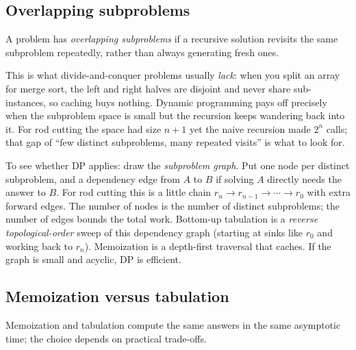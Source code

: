 \subsection{Overlapping subproblems}

\begin{definition}
\label{ch15:def-overlap}
A problem has \emph{overlapping subproblems} if a recursive solution revisits
the same subproblem repeatedly, rather than always generating fresh ones.
\end{definition}

This is what divide-and-conquer problems usually \emph{lack}: when you split an
array for merge sort, the left and right halves are disjoint and never share
sub-instances, so caching buys nothing. Dynamic programming pays off precisely
when the subproblem space is small but the recursion keeps wandering back into
it. For rod cutting the space had size $n+1$ yet the naive recursion made $2^n$
calls; that gap of ``few distinct subproblems, many repeated visits'' is what
to look for.

\begin{intuitionbox}
To see whether DP applies: draw the \emph{subproblem graph}. Put one
node per distinct subproblem, and a dependency edge from $A$ to $B$ if solving $A$
directly needs the answer to $B$. For rod cutting this is a little chain
$r_n \to r_{n-1} \to \cdots \to r_0$ with extra forward edges. The number of
nodes is the number of distinct subproblems; the number of edges bounds the
total work. Bottom-up tabulation is a \emph{reverse topological-order} sweep of this
dependency graph (starting at sinks like $r_0$ and working back to $r_n$). Memoization is a depth-first traversal that caches. If the graph is
small and acyclic, DP is efficient.
\end{intuitionbox}

\subsection{Memoization versus tabulation}

Memoization and tabulation compute the same answers in the same asymptotic time;
the choice depends on practical trade-offs.

